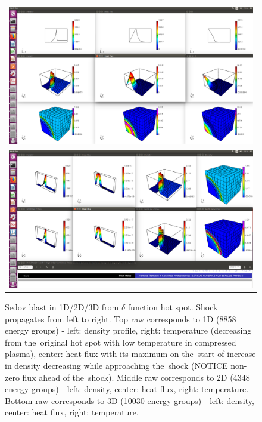 \documentclass[review]{elsarticle}
\begin{document}
\begin{figure}[tbh]
  \begin{center}
    \begin{tabular}{c}
      \includegraphics[width=1.0\textwidth]{M1Sedov1D2D3D.png} \\
      \includegraphics[width=1.0\textwidth]{M1_physical_analysis.png}
    \end{tabular}
  \caption{
  Sedov blast in 1D/2D/3D from $\delta$ function hot spot. 
  Shock propagates from left to right. Top raw corresponds to 1D 
  (8858 energy groups) - 
  left: density profile, right: temperature 
  (decreasing from the~original hot spot with low temperature in compressed 
  plasma), center: heat flux with its maximum on the~start of increase 
  in density decreasing while approaching the~shock 
  (NOTICE non-zero flux ahead of the~shock). 
  Middle raw corresponds to 2D (4348 energy groups) - 
  left: density, center: heat flux, right: temperature.
  Bottom raw corresponds to 3D (10030 energy groups) - 
  left: density, center: heat flux, right: temperature. 
  }
  \end{center}
  \label{fig:expl1D2D3D}
\end{figure}
\end{document}
